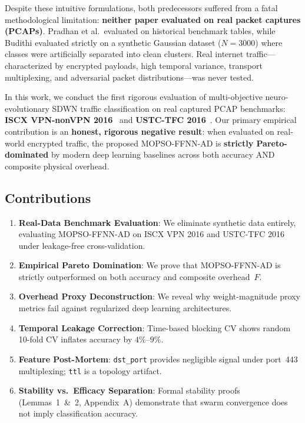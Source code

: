 \documentclass[journal]{IEEEtran}
\begin{document}
Despite these intuitive formulations, both predecessors suffered from a fatal
methodological limitation: \textbf{neither paper evaluated on real packet
captures (PCAPs)}. Pradhan et al.\ evaluated on historical benchmark tables,
while Budithi evaluated strictly on a synthetic Gaussian dataset ($N{=}3000$)
where classes were artificially separated into clean clusters. Real internet
traffic---characterized by encrypted payloads, high temporal variance, transport
multiplexing, and adversarial packet distributions---was never tested.

In this work, we conduct the first rigorous evaluation of multi-objective
neuro-evolutionary SDWN traffic classification on real captured PCAP
benchmarks: \textbf{ISCX VPN-nonVPN 2016}~\cite{draper2016} and
\textbf{USTC-TFC 2016}~\cite{wang2017}. Our primary empirical contribution is
an \textbf{honest, rigorous negative result}: when evaluated on real-world
encrypted traffic, the proposed MOPSO-FFNN-AD is \textbf{strictly
Pareto-dominated} by modern deep learning baselines across both accuracy AND
composite physical overhead.

\subsection*{Contributions}
\begin{enumerate}
  \item \textbf{Real-Data Benchmark Evaluation}: We eliminate synthetic data
    entirely, evaluating MOPSO-FFNN-AD on ISCX VPN 2016 and USTC-TFC 2016
    under leakage-free cross-validation.
  \item \textbf{Empirical Pareto Domination}: We prove that MOPSO-FFNN-AD is
    strictly outperformed on both accuracy and composite overhead~$F$.
  \item \textbf{Overhead Proxy Deconstruction}: We reveal why weight-magnitude
    proxy metrics fail against regularized deep learning architectures.
  \item \textbf{Temporal Leakage Correction}: Time-based blocking CV shows
    random 10-fold CV inflates accuracy by $4\%$--$9\%$.
  \item \textbf{Feature Post-Mortem}: \texttt{dst\_port} provides negligible
    signal under port~443 multiplexing; \texttt{ttl} is a topology artifact.
  \item \textbf{Stability vs.\ Efficacy Separation}: Formal stability proofs
    (Lemmas~1~\&~2, Appendix~A) demonstrate that swarm convergence does not
    imply classification accuracy.
\end{enumerate}
\end{document}
